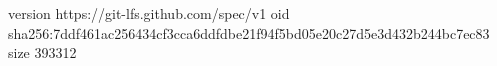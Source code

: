 version https://git-lfs.github.com/spec/v1
oid sha256:7ddf461ac256434cf3cca6ddfdbe21f94f5bd05e20c27d5e3d432b244bc7ec83
size 393312
